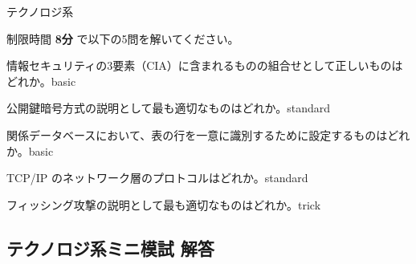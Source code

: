 \mondaipage
\begin{minimoshi}{テクノロジ系}

制限時間 \textbf{8分} で以下の5問を解いてください。

\begin{mondai}{情報セキュリティの3要素（CIA）に含まれるものの組合せとして正しいものはどれか。}{basic}
\end{mondai}

\begin{mondai}{公開鍵暗号方式の説明として最も適切なものはどれか。}{standard}
\end{mondai}

\begin{mondai}{関係データベースにおいて、表の行を一意に識別するために設定するものはどれか。}{basic}
\end{mondai}

\begin{mondai}{TCP/IP のネットワーク層のプロトコルはどれか。}{standard}
\end{mondai}

\begin{mondai}{フィッシング攻撃の説明として最も適切なものはどれか。}{trick}
\end{mondai}

\end{minimoshi}

\kaitoupage
\subsection*{テクノロジ系ミニ模試 解答}

